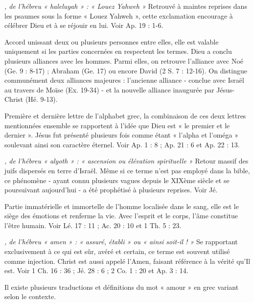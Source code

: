 \begin{multicols}{2}
\textit{, de l’hébreu « haleluyah » : « Louez Yahweh »}\newline
Retrouvé à maintes reprises dans les psaumes sous la forme « Louez Yahweh », cette exclamation encourage à célébrer Dieu et à se réjouir en lui. Voir Ap. 19 : 1-6.

\textit{}\newline
Accord unissant deux ou plusieurs personnes entre elles, elle est valable uniquement si les parties concernées en respectent les termes. Dieu a conclu plusieurs alliances avec les hommes. Parmi elles, on retrouve l’alliance avec Noé (Ge. 9 : 8-17) ; Abraham (Ge. 17) ou encore David (2 S. 7 : 12-16). On distingue communément deux alliances majeures : l’ancienne alliance - conclue avec Israël au travers de Moïse (Ex. 19-34) - et la nouvelle alliance inaugurée par Jésus-Christ (Hé. 9-13).

\textit{}\newline
Première et dernière lettre de l'alphabet grec, la combinaison de ces deux lettres mentionnées ensemble se rapportent à l’idée que Dieu est « le premier et le dernier ». Jésus fut présenté plusieurs fois comme étant « l’alpha et l’oméga » soulevant ainsi son caractère éternel. Voir Ap. 1 : 8 ; Ap. 21 : 6 et Ap. 22 : 13.

\textit{, de l’hébreu « alyoth » : « ascension ou élévation spirituelle »}\newline
Retour massif des juifs dispersés en terre d'Israël. Même si ce terme n’est pas employé dans la bible, ce phénomène - ayant connu plusieurs vagues depuis le XIXème siècle et se poursuivant aujourd’hui - a été prophétisé à plusieurs reprises. Voir Jé.

\textit{}\newline
Partie immatérielle et immortelle de l'homme localisée dans le sang, elle est le siège des émotions et renferme la vie. Avec l'esprit et le corps, l'âme constitue l'être humain. Voir Lé. 17 : 11 ; Ac. 20 : 10 et 1 Th. 5 : 23.

\textit{, de l’hébreu « amen » : « assuré, établi » ou « ainsi soit-il ! »}\newline
Se rapportant exclusivement à ce qui est sûr, avéré et certain, ce terme est souvent utilisé comme injection. Christ est aussi appelé l'Amen, faisant référence à la vérité qu’Il est. Voir 1 Ch. 16 : 36 ; Jé. 28 : 6 ; 2 Co. 1 : 20 et Ap. 3 : 14.

\textit{}\newline
Il existe plusieurs traductions et définitions du mot « amour » en grec variant selon le contexte.


\end{multicols}
